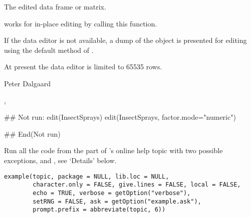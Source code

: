 %
\begin{Value}
The edited data frame or matrix.
\end{Value}
%
\begin{Note}\relax
{} works for in-place editing by calling this
function.

If the data editor is not available, a dump of the object is presented
for editing using the default method of .

At present the data editor is limited to 65535 rows.
\end{Note}
%
\begin{Author}\relax
 Peter Dalgaard 
\end{Author}
%
\begin{SeeAlso}\relax
{}, 
\end{SeeAlso}
%
\begin{Examples}
\begin{ExampleCode}
## Not run: 
edit(InsectSprays)
edit(InsectSprays, factor.mode="numeric")

## End(Not run)
\end{ExampleCode}
\end{Examples}
%
\begin{Description}\relax
Run all the \R{} code from the  part of \R{}'s online help
topic  with two possible exceptions,  and
, see `Details' below.
\end{Description}
%
\begin{Usage}
\begin{verbatim}
example(topic, package = NULL, lib.loc = NULL,
        character.only = FALSE, give.lines = FALSE, local = FALSE,
        echo = TRUE, verbose = getOption("verbose"),
        setRNG = FALSE, ask = getOption("example.ask"),
        prompt.prefix = abbreviate(topic, 6))
\end{verbatim}
\end{Usage}
%
